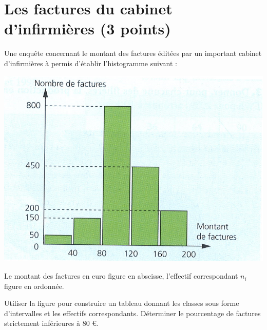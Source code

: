 \section{Les factures du cabinet d'infirmières (3 points)}

Une enquête concernant le montant des factures éditées par un important cabinet d'infirmières à permis d'établir l'histogramme suivant :

\begin{center}
	\includegraphics[scale=1]{factures}
\end{center}

Le montant des factures en euro figure en abscisse, l'effectif correspondant $n_i$ figure en ordonnée.

\begin{questions}
	\question[2] Utiliser la figure pour construire un tableau donnant les classes sous forme d'intervalles et les effectifs correspondants.
	\question[1] Déterminer le pourcentage de factures strictement inférieures à 80 €.
\end{questions}